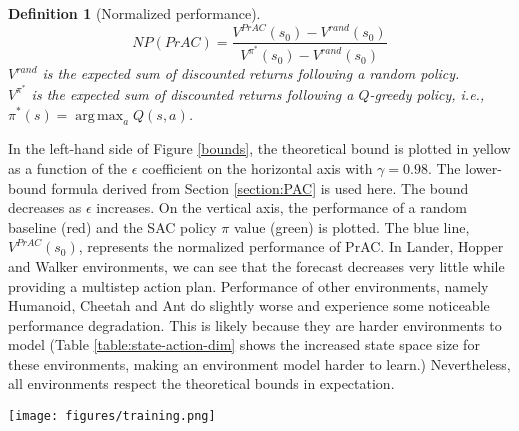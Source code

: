\documentclass[letterpaper]{article} %
\DeclareMathOperator*{\argmax}{arg\,max}
\newtheorem{definition}{Definition}[]
\begin{document}
            \begin{definition}[Normalized performance]
                $$NP(PrAC)=\frac{V^{PrAC}(s_0) -V^{rand}(s_0)}{V^{\pi^*}(s_0)-V^{rand}(s_0)}$$
                $V^{rand}$ is the expected sum of discounted returns following a random policy.\\
                $V^{\pi^*}$ is the expected sum of discounted returns following a $Q$-greedy policy, i.e., $\pi^*(s)=\argmax_aQ(s,a)$. 
            \end{definition}

            In the left-hand side of Figure \ref{bounds}, the theoretical bound is plotted in yellow as a function of the $\epsilon$ coefficient on the horizontal axis with $\gamma = 0.98$. The lower-bound formula derived from Section \ref{section:PAC} is used here. The bound decreases as $\epsilon$ increases. On the vertical axis, the performance of a random baseline (red) and the SAC policy $\pi$ value (green) is plotted. The blue line, $V^{PrAC}(s_0)$, represents the normalized performance of PrAC. In Lander, Hopper and Walker environments, we can see that the forecast decreases very little while providing a multistep action plan. Performance of other environments, namely Humanoid, Cheetah and Ant do slightly worse and experience some noticeable performance degradation. This is likely because they are harder environments to model (Table \ref{table:state-action-dim} shows the increased state space size for these environments, making an environment model harder to learn.) Nevertheless, all environments respect the theoretical bounds in expectation.  


            \begin{figure*}
                \texttt{[image: figures/training.png]}
                \caption{Top: training curves from representative environments. The $y$ axis is the normalized episode reward. Bottom: The associated forecast for the environments. The baseline algorithm shows SAC without any modifications. Experiments run with 5 replications of each setting. Shown with 1 std. Mean and std aggregated over rolling window of 20 episodes. The forecast of PrAC(0.1) for cheetah and humanoid has been capped at 16 and 20, respectively, for computational considerations. Humanoid-0.1 is stopped after 3e6 steps as it fails to improve beyond random.}
                \label{figure:training}
            \end{figure*}
\end{document}
